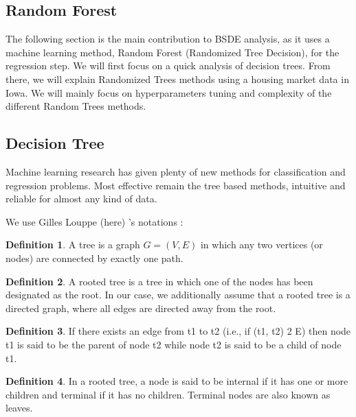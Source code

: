 \documentclass[english,11pt,openany]{article}
\theoremstyle{definition}
\newtheorem{defn}{Definition}[section]
\theoremstyle{plain}
\theoremstyle{definition}
\begin{document}
	\newpage
	\begin{appendices}
		\section{Random Forest}
		
		
		\begin{minipage}{\textwidth-2\fboxrule-2\fboxsep\relax}
			The following section is the main contribution to BSDE analysis, as it uses a machine learning method, Random Forest (Randomized Tree Decision), for the regression step. 
			We will first focus on a quick analysis of decision trees. From there, we will explain Randomized Trees methods using a housing market data in Iowa. We will mainly focus on  hyperparameters tuning and complexity of the different Random Trees methods. 
		\end{minipage}
		
		
		\subsection{Decision Tree}
		Machine learning research has given plenty of new methods for classification and regression problems. Most effective remain the tree based methods, intuitive and reliable for almost any kind of data. 
		
		We use Gilles Louppe (here) 's notations : 
		
		\begin{defn}
			A tree is a graph $G = (V, E)$ in which any two vertices (or
			nodes) are connected by exactly one path.
		\end{defn}
		
		\begin{defn}
			A rooted tree is a tree in which one of the nodes has been
			designated as the root. In our case, we additionally assume that a rooted tree
			is a directed graph, where all edges are directed away from the root.
		\end{defn}
		
		\begin{defn}
			If there exists an edge from t1 to t2 (i.e., if (t1, t2) 2 E)
			then node t1 is said to be the parent of node t2 while node t2 is said to be a
			child of node t1.
		\end{defn}
		
		\begin{defn}
			In a rooted tree, a node is said to be internal if it has one
			or more children and terminal if it has no children. Terminal nodes are also
			known as leaves.
		\end{defn}
		

\end{appendices}
\end{document}
